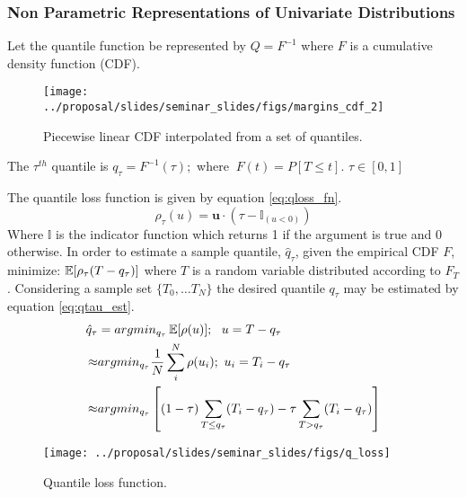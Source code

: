 \subsubsection{Non Parametric Representations of Univariate Distributions}



Let the quantile function be represented by $Q=F^{-1}$ where $F$ is a cumulative density function (CDF).

\begin{figure}[H]
    \centering
    \texttt{[image: ../proposal/slides/seminar\_slides/figs/margins\_cdf\_2]}
    \caption[CDF from quantiles.]{Piecewise linear CDF interpolated from a set of quantiles.}
    \label{fig:marginscdf2}
\end{figure}


The $\tau^{th}$ quantile is $q_\tau = F^{-1}(\tau); $ where $\ F(t)=P[T \leq t]$.
$\tau \in [0, 1]$

The quantile loss function is given by equation \ref{eq:qloss_fn}.
\begin{equation}
\rho_\tau( u) = \mathbf u \cdot (\tau - \mathbb{I}_{( u < 0)})
\label{eq:qloss_fn}
\end{equation}
Where $\mathbb{I}$ is the indicator function which returns 1 if the argument is true and 0 otherwise.
In order to estimate a sample quantile, $\hat q_\tau$, given the empirical CDF $F$, minimize: $\operatorname*{\mathbb{E}}[\rho_\tau(T - q_\tau)]$ where $T$ is a random variable distributed according to $F_T$.  Considering a sample set $\{T_0, \dots T_N \}$ the desired quantile $q_\tau$ may be estimated by equation \ref{eq:qtau_est}.
\begin{equation}
            \left.\begin{aligned}
            \hat q_{\tau} &= argmin_{q_\tau} \operatorname*{\mathbb{E}}[\rho(u)];\ \  u = T - q_\tau  \\
            \approx & argmin_{q_\tau}  \frac{1}{N} \sum_i^N \rho(u_i); \ u_i = T_i - q_\tau \\
            \approx & argmin_{q_\tau} \left[ (1-\tau) \sum_{T \leq q_\tau}( T_i - q_\tau ) - \tau \sum_{T > q_\tau} (T_i - q_\tau) \right]
            \end{aligned}\right.
            \label{eq:qtau_est}
\end{equation}

\begin{figure}[H]
    \centering
    \texttt{[image: ../proposal/slides/seminar\_slides/figs/q\_loss]}
    \caption[Quantile loss function.]{Quantile loss function.}
    \label{fig:qloss}
\end{figure}


